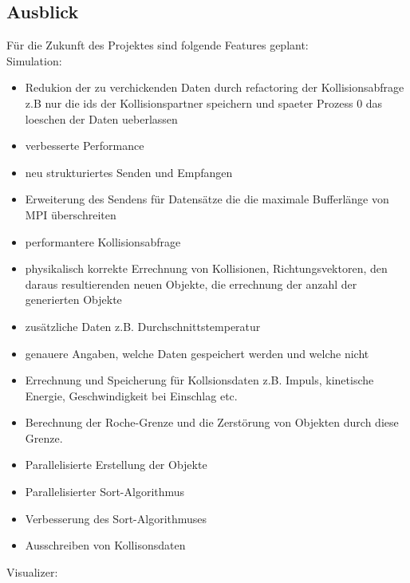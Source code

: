 \subsection{Ausblick}
Für die Zukunft des Projektes sind folgende Features geplant:
\\
Simulation:
\begin{itemize}
    \item Redukion der zu verchickenden Daten durch refactoring der Kollisionsabfrage
          z.B nur die ids der Kollisionspartner speichern und spaeter Prozess 0 das loeschen
          der Daten ueberlassen
    \item verbesserte Performance
    \item neu strukturiertes Senden und Empfangen
    \item Erweiterung des Sendens für Datensätze die die maximale Bufferlänge von MPI überschreiten
    \item performantere Kollisionsabfrage
    \item physikalisch korrekte Errechnung von Kollisionen, 
          Richtungsvektoren, den daraus resultierenden neuen Objekte,
          die errechnung der anzahl der generierten Objekte    
    \item zusätzliche Daten z.B. Durchschnittstemperatur
    \item genauere Angaben, welche Daten gespeichert werden und welche nicht
    \item Errechnung und Speicherung für Kollsionsdaten z.B. Impuls, kinetische Energie, Geschwindigkeit bei Einschlag etc.
    \item Berechnung der Roche-Grenze und die Zerstörung von Objekten durch diese Grenze.
    \item Parallelisierte Erstellung der Objekte
    \item Parallelisierter Sort-Algorithmus
    \item Verbesserung des Sort-Algorithmuses
    \item Ausschreiben von Kollisonsdaten

\end{itemize}
Visualizer:
